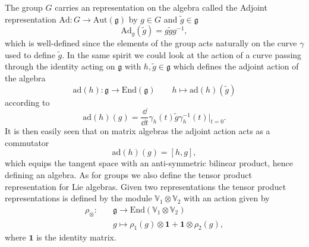 \documentclass[11pt]{report}
\begin{document}
The group $G$ carries an representation on the algebra called the Adjoint representation $\text{Ad}: G\to \text{Aut}(\mathfrak{g})$ by $g\in G$ and $\tilde{g}\in\mathfrak{g}$
\begin{equation}\label{eq:Liegrouprep}
    \text{Ad}_g(\tilde{g}) = g\tilde{g}g^{-1},
\end{equation}
which is well-defined since the elements of the group acts naturally on the curve $\gamma$ used to define $\tilde{g}$. In the same spirit we could look at the action of a curve passing through the identity acting on $\mathfrak{g}$ with $h,\tilde{g}\in \mathfrak{g}$ which defines the adjoint action of the algebra 
\begin{equation}
    \text{ad}(h): \mathfrak{g}\to \text{End}(\mathfrak{g})\qquad h\mapsto \text{ad}(h)(\tilde{g})
\end{equation}
according to 
\begin{equation}
    \text{ad}(h)(g) = \frac{\dd}{\dd t}\gamma_h(t)\tilde{g}\gamma_h^{-1}(t)|_{t=0}.
\end{equation}
It is then easily seen that on matrix algebras the adjoint action acts as a commutator 
\begin{equation}
    \text{ad}(h)(g) = [h,g],
\end{equation}
which equips the tangent space with an anti-symmetric bilinear product, hence defining an algebra. As for groups we also define the tensor product representation for Lie algebras. Given two representations the tensor product representations is defined by the module $\mathbb{V}_1\otimes\mathbb{V}_2$ with an action given by 
\begin{equation}
    \begin{aligned}
        \rho_\otimes:\quad &\mathfrak{g}\to\text{End}\left(\mathbb{V}_1\otimes\mathbb{V}_2\right) \\
                & g\mapsto \rho_1(g)\otimes \mathbf{1}+\mathbf{1}\otimes\rho_2(g),
    \end{aligned}
\end{equation}
where $\mathbf{1}$ is the identity matrix.
\end{document}
